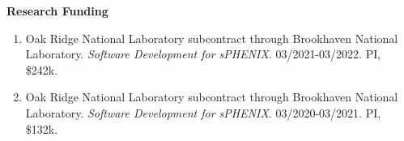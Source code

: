 \documentclass[11pt]{article}
\begin{document}
\vspace{7pt}

\begin{flushleft}
	\Large\textbf{Research Funding}
	\vspace{4pt}
	\normalsize
	\begin{center}
		\begin{enumerate}
			\item Oak Ridge National Laboratory subcontract through Brookhaven National Laboratory. \textit{Software Development for sPHENIX}. 03/2021-03/2022. PI, \$242k.
			\item Oak Ridge National Laboratory subcontract through Brookhaven National Laboratory. \textit{Software Development for sPHENIX}. 03/2020-03/2021. PI, \$132k.
		\end{enumerate}
	\end{center}
\end{flushleft}


\vspace{7pt}
\end{document}
